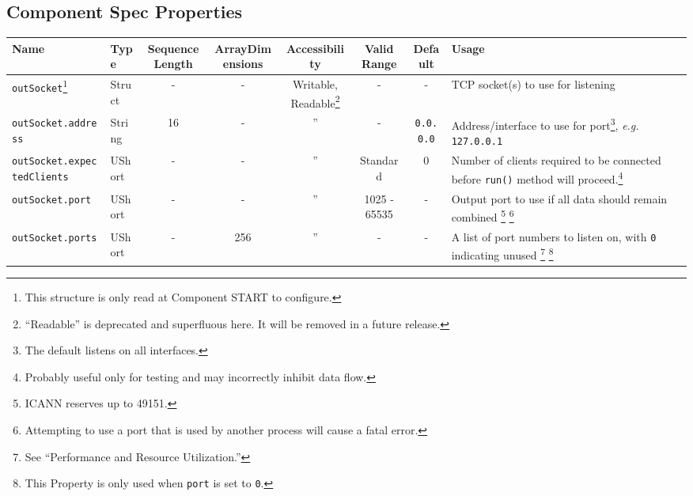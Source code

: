 \begin{landscape}
  \section*{Component Spec Properties}
  \begin{minipage}{\textwidth}
    \renewcommand*\footnoterule{} %
    \renewcommand{\thempfootnote}{\arabic{mpfootnote}} %
  \begin{scriptsize}
    \begin{tabular}{|p{3.2cm}|p{1.5cm}|c|c|c|c|c|p{7cm}|}
      \hline
      \rowcolor{blue}
      Name &
      Type &
      SequenceLength &
      ArrayDimensions &
      Accessibility &
      Valid Range &
      Default &
      Usage \\
      \hline
      \verb+outSocket+\footnote{This structure is only read at Component START to configure.} &
      Struct &
      - &
      - &
      Writable, Readable\footnote{``Readable'' is deprecated and superfluous here. It will be removed in a future release.}\setcounter{fnreadable}{\thempfootnote} &
      - &
      - &
      TCP socket(s) to use for listening \\
      \hline
      \verb+outSocket.address+ &
      String &
      16 &
      - &
      '' &
      - &
      \verb+0.0.0.0+ &
      Address/interface to use for port\footnote{The default listens on all interfaces.}, \textit{e.g.} \verb+127.0.0.1+ \\
      \hline
      \verb+outSocket.expectedClients+ &
      UShort &
      - &
      - &
      '' &
      Standard &
      0 &
      Number of clients required to be connected before \verb+run()+ method will proceed.\footnote{Probably useful only for testing and may incorrectly inhibit data flow.} \\
      \hline
      \verb+outSocket.port+ &
      UShort &
      - &
      - &
      '' &
      1025 - 65535 &
      - &
      Output port to use if all data should remain combined \footnote{ICANN reserves up to 49151.} \footnote{Attempting to use a port that is used by another process will cause a fatal error.} \\
      \hline
      \verb+outSocket.ports+ &
      UShort &
      - &
      256 &
      '' &
      - &
      - &
      A list of port numbers to listen on, with \verb+0+ indicating unused \footnote{See ``Performance and Resource Utilization.''} \footnote{This Property is only used when \texttt{port} is set to \texttt{0}.}\\

\end{tabular}
\end{scriptsize}
\end{minipage}
\end{landscape}
